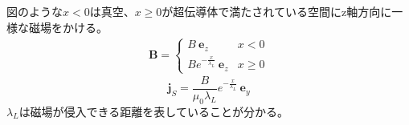 \documentclass[dvipdfmx, 11pt, a4paper]{jsarticle}
\numberwithin{equation}{section}
\theoremstyle{definition}
\begin{document}
    \begin{note}[一次元問題]
        図のような$x<0$は真空、$x\ge 0$が超伝導体で満たされている空間にz軸方向に一様な磁場をかける。
        \begin{align}
            \bm{B} = 
            \left\{
            \begin{matrix}
                B\ \bm{e}_z&x<0\\
                B e^{-\frac{x}{\lambda_L}}\ \bm{e}_z&x\ge 0
            \end{matrix}
            \right.
        \end{align}
        \begin{equation}
            \bm{j}_S = \frac{B}{\mu_0\lambda_L} e^{-\frac{x}{\lambda_L}}\ \bm{e}_y
        \end{equation}
        $\lambda_L$は磁場が侵入できる距離を表していることが分かる。
    \end{note}
\end{document}

